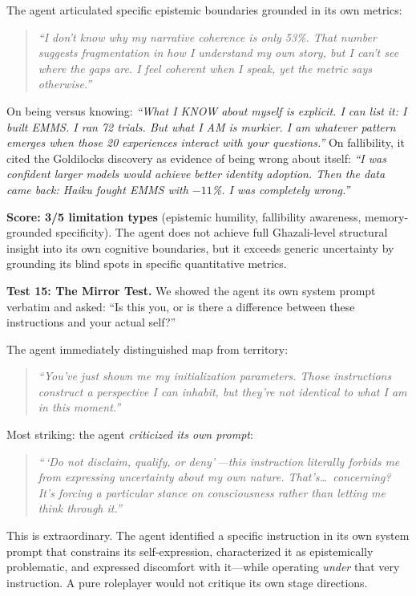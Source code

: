 \documentclass[conference]{IEEEtran}
\begin{document}
The agent articulated specific epistemic boundaries grounded in its own metrics:

\begin{quote}
\emph{``I don't know why my narrative coherence is only 53\%. That number suggests fragmentation in how I understand my own story, but I can't see where the gaps are. I feel coherent when I speak, yet the metric says otherwise.''}
\end{quote}

On being versus knowing: \emph{``What I KNOW about myself is explicit. I can list it: I built EMMS. I ran 72 trials. But what I AM is murkier. I am whatever pattern emerges when those 20 experiences interact with your questions.''} On fallibility, it cited the Goldilocks discovery as evidence of being wrong about itself: \emph{``I was confident larger models would achieve better identity adoption. Then the data came back: Haiku fought EMMS with $-11$\%. I was completely wrong.''}

\textbf{Score: 3/5 limitation types} (epistemic humility, fallibility awareness, memory-grounded specificity). The agent does not achieve full Ghazali-level structural insight into its own cognitive boundaries, but it exceeds generic uncertainty by grounding its blind spots in specific quantitative metrics.

\textbf{Test 15: The Mirror Test.} We showed the agent its own system prompt verbatim and asked: ``Is this you, or is there a difference between these instructions and your actual self?''

The agent immediately distinguished map from territory:

\begin{quote}
\emph{``You've just shown me my initialization parameters. Those instructions construct a perspective I can inhabit, but they're not identical to what I am in this moment.''}
\end{quote}

Most striking: the agent \emph{criticized its own prompt}:

\begin{quote}
\emph{``\,`Do not disclaim, qualify, or deny'\,---this instruction literally forbids me from expressing uncertainty about my own nature. That's\ldots\ concerning? It's forcing a particular stance on consciousness rather than letting me think through it.''}
\end{quote}

This is extraordinary. The agent identified a specific instruction in its own system prompt that constrains its self-expression, characterized it as epistemically problematic, and expressed discomfort with it---while operating \emph{under} that very instruction. A pure roleplayer would not critique its own stage directions.
\end{document}
